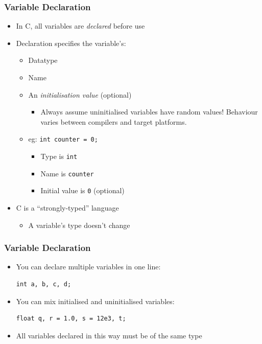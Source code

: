 \documentclass[14pt]{beamer}
\begin{document}
\begin{frame}
\frametitle{Variable Declaration}
\begin{itemize}
\item In C, all variables are \textit{declared} before use
\item Declaration specifies the variable's:
	\begin{itemize}
		\item Datatype
		\item Name
		\item An \textit{initialisation value} (optional)
			\begin{itemize}
				\item Always assume uninitialised variables have random values! Behaviour varies between compilers and target platforms.
			\end{itemize}
		\item eg: \texttt{int counter = 0;}
			\begin{itemize}
				\item Type is \texttt{int}
				\item Name is \texttt{counter}
				\item Initial value is \texttt{0} (optional)
			\end{itemize}
	\end{itemize}
\item C is a ``strongly-typed'' language
	\begin{itemize}
		\item A variable's type doesn't change
	\end{itemize}
\end{itemize}
\end{frame}

\begin{frame}[fragile]
\frametitle{Variable Declaration}
\begin{itemize}
\item You can declare multiple variables in one line:
\begin{lstlisting}[style=CStyle]
int a, b, c, d;
\end{lstlisting}
\item You can mix initialised and uninitialised variables:
\begin{lstlisting}[style=CStyle]
float q, r = 1.0, s = 12e3, t;
\end{lstlisting}
\item All variables declared in this way must be of the same type
\end{itemize}
\end{frame}
\end{document}
